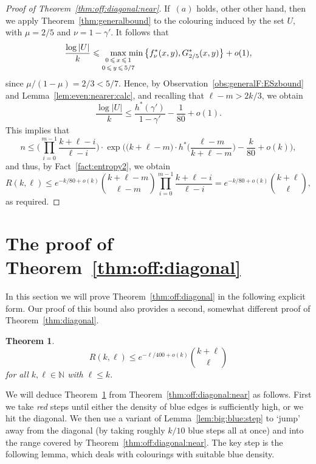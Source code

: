 \documentclass[12pt,reqno]{amsart}
\newtheorem{theorem}{Theorem}[section]
\theoremstyle{definition}
\theoremstyle{remark}
\newcommand\N{\mathbb{N}}
\renewcommand{\le}{\leqslant}
\def\N{\mathbb{N}}
\begin{document}
\begin{proof}[Proof of Theorem~\ref{thm:off:diagonal:near}]
If~$(a)$ holds, other other hand, then we apply Theorem~\ref{thm:generalbound} to the colouring induced by the set $U$, with $\mu = 2/5$ and $\nu = 1 - \gamma'$. It follows that %
$$\frac{\log |U|}{k} \le \max_{\substack{\\[-0.05ex] 0 \,\le\, x \,\le\, 1 \\[+0.3ex] 0 \,\le\, y \,\le\, 5/7}} \hspace{-0.3cm} \min \big\{ f^*_\nu (x,y),G^*_{2/5}(x,y) \big\} + o(1),$$
since $\mu/(1-\mu) = 2/3 < 5/7$. Hence, by Observation~\ref{obs:generalF:ESzbound} and Lemma~\ref{lem:even:nearer:calc}, and recalling that $\ell - m > 2k/3$, we obtain
$$\frac{\log |U|}{k} \le \frac{h^*(\gamma')}{1-\gamma'} - \frac{1}{80} + o(1).$$
This implies that
$$n \le \bigg( \prod_{i = 0}^{m-1} \frac{k + \ell - i}{\ell - i} \bigg) \cdot \exp\bigg( \big( k + \ell - m \big) \cdot h^*\bigg( \frac{\ell - m}{k + \ell - m} \bigg) - \frac{k}{80}  + o(k) \bigg),$$
and thus, by Fact~\ref{fact:entropy2}, we obtain
$$R(k,\ell) \le e^{-k/80 + o(k)} {k + \ell - m \choose \ell - m} \prod_{i = 0}^{m-1} \frac{k + \ell - i}{\ell - i} = e^{-k/80 + o(k)} {k + \ell \choose \ell},$$
as required. 
\end{proof}


\pagebreak
 
 \section{The proof of Theorem~\ref{thm:off:diagonal}}\label{finalproof:sec}

 In this section we will prove Theorem~\ref{thm:off:diagonal} in the following explicit form. Our proof of this bound also provides a second, somewhat different proof of Theorem~\ref{thm:diagonal}. %
 
 
\begin{theorem}\label{thm:off:diagonal:explicit}
$$R(k,\ell) \le e^{-\ell/400 + o(k)} {k + \ell \choose \ell}$$
for all $k,\ell \in \N$ with $\ell \le k$. 
\end{theorem}

We will deduce Theorem~\ref{thm:off:diagonal:explicit} from Theorem~\ref{thm:off:diagonal:near} as follows. First we take \emph{red} steps %
until either the density of blue edges is sufficiently high, %
or we hit the diagonal. We then use a variant of Lemma~\ref{lem:big:blue:step} to `jump' away from the diagonal (by taking roughly $k/10$ blue steps all at once) and into the range covered by Theorem~\ref{thm:off:diagonal:near}. The key step is the following lemma, which deals with colourings with suitable blue density. 
\end{document}

